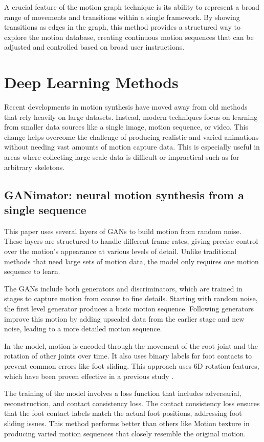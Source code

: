 \documentclass[a4paper, 12pt]{report}
\begin{document}
A crucial feature of the motion graph technique is its ability to represent a broad range of movements and transitions within a single framework. By showing transitions as edges in the graph, this method provides a structured way to explore the motion database, creating continuous motion sequences that can be adjusted and controlled based on broad user instructions.

\section{Deep Learning Methods}
Recent developments in motion synthesis have moved away from old methods that rely heavily on large datasets. Instead, modern techniques focus on learning from smaller data sources like a single image, motion sequence, or video. This change helps overcome the challenge of producing realistic and varied animations without needing vast amounts of motion capture data. This is especially useful in areas where collecting large-scale data is difficult or impractical such as for arbitrary skeletons.

\subsection{GANimator: neural motion synthesis from a single sequence}
This paper \cite{li_ganimator_2022} uses several layers of GANs to build motion from random noise. These layers are structured to handle different frame rates, giving precise control over the motion's appearance at various levels of detail. Unlike traditional methods that need large sets of motion data, the model only requires one motion sequence to learn.

The GANs include both generators and discriminators, which are trained in stages to capture motion from coarse to fine details. Starting with random noise, the first level generator produces a basic motion sequence. Following generators improve this motion by adding upscaled data from the earlier stage and new noise, leading to a more detailed motion sequence.

In the model, motion is encoded through the movement of the root joint and the rotation of other joints over time. It also uses binary labels for foot contacts to prevent common errors like foot sliding. This approach uses 6D rotation features, which have been proven effective in a previous study \cite{zhou_continuity_2020}.

The training of the model involves a loss function that includes adversarial, reconstruction, and contact consistency loss. The contact consistency loss ensures that the foot contact labels match the actual foot positions, addressing foot sliding issues. This method performs better than others like Motion texture in producing varied motion sequences that closely resemble the original motion.
\end{document}
